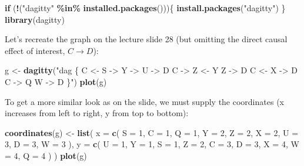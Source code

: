 \documentclass[
]{book}
\newenvironment{Shaded}{\begin{snugshade}}{\end{snugshade}}
\newcommand{\AttributeTok}[1]{\textcolor[rgb]{0.13,0.29,0.53}{#1}}
\newcommand{\ControlFlowTok}[1]{\textcolor[rgb]{0.13,0.29,0.53}{\textbf{#1}}}
\newcommand{\DecValTok}[1]{\textcolor[rgb]{0.00,0.00,0.81}{#1}}
\newcommand{\FunctionTok}[1]{\textcolor[rgb]{0.13,0.29,0.53}{\textbf{#1}}}
\newcommand{\NormalTok}[1]{#1}
\newcommand{\OtherTok}[1]{\textcolor[rgb]{0.56,0.35,0.01}{#1}}
\newcommand{\SpecialCharTok}[1]{\textcolor[rgb]{0.81,0.36,0.00}{\textbf{#1}}}
\newcommand{\StringTok}[1]{\textcolor[rgb]{0.31,0.60,0.02}{#1}}
\begin{document}
\begin{Shaded}
\begin{Highlighting}[]
\ControlFlowTok{if}\NormalTok{ (}\SpecialCharTok{!}\NormalTok{(}\StringTok{"dagitty"} \SpecialCharTok{\%in\%} \FunctionTok{installed.packages}\NormalTok{()))\{}
  \FunctionTok{install.packages}\NormalTok{(}\StringTok{"dagitty"}\NormalTok{)}
\NormalTok{\}}
\FunctionTok{library}\NormalTok{(dagitty)}
\end{Highlighting}
\end{Shaded}

Let's recreate the graph on the lecture slide 28 (but omitting the direct causal effect of interest, \(C \rightarrow D\)):

\begin{Shaded}
\begin{Highlighting}[]
\NormalTok{g }\OtherTok{\textless{}{-}} \FunctionTok{dagitty}\NormalTok{(}\StringTok{"dag \{}
\StringTok{    C \textless{}{-} S {-}\textgreater{} Y {-}\textgreater{} U {-}\textgreater{} D}
\StringTok{    C {-}\textgreater{} Z \textless{}{-} Y}
\StringTok{    Z {-}\textgreater{} D}
\StringTok{    C \textless{}{-} X {-}\textgreater{} D}
\StringTok{    C {-}\textgreater{} Q}
\StringTok{    W {-}\textgreater{} D}
\StringTok{  \}"}\NormalTok{)}
\FunctionTok{plot}\NormalTok{(g)}
\end{Highlighting}
\end{Shaded}

To get a more similar look as on the slide, we must supply the coordinates (x increases from left to right, y from top to bottom):

\begin{Shaded}
\begin{Highlighting}[]
\FunctionTok{coordinates}\NormalTok{(g) }\OtherTok{\textless{}{-}} 
  \FunctionTok{list}\NormalTok{(}
    \AttributeTok{x =} 
      \FunctionTok{c}\NormalTok{(}
        \AttributeTok{S =} \DecValTok{1}\NormalTok{, }\AttributeTok{C =} \DecValTok{1}\NormalTok{, }\AttributeTok{Q =} \DecValTok{1}\NormalTok{, }\AttributeTok{Y =} \DecValTok{2}\NormalTok{, }\AttributeTok{Z =} \DecValTok{2}\NormalTok{, }
        \AttributeTok{X =} \DecValTok{2}\NormalTok{, }\AttributeTok{U =} \DecValTok{3}\NormalTok{, }\AttributeTok{D =} \DecValTok{3}\NormalTok{, }\AttributeTok{W =} \DecValTok{3}
\NormalTok{      ),}
    \AttributeTok{y =} 
      \FunctionTok{c}\NormalTok{(}
        \AttributeTok{U =} \DecValTok{1}\NormalTok{, }\AttributeTok{Y =} \DecValTok{1}\NormalTok{, }\AttributeTok{S =} \DecValTok{1}\NormalTok{, }\AttributeTok{Z =} \DecValTok{2}\NormalTok{, }\AttributeTok{C =} \DecValTok{3}\NormalTok{, }
        \AttributeTok{D =} \DecValTok{3}\NormalTok{, }\AttributeTok{X =} \DecValTok{4}\NormalTok{, }\AttributeTok{W =} \DecValTok{4}\NormalTok{, }\AttributeTok{Q =} \DecValTok{4}
\NormalTok{      )}
\NormalTok{  )}
\FunctionTok{plot}\NormalTok{(g)}
\end{Highlighting}
\end{Shaded}
\end{document}
